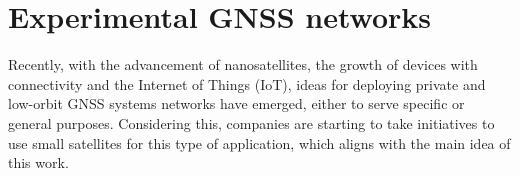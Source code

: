 
\section{Experimental GNSS networks}


Recently, with the advancement of nanosatellites, the growth of devices with connectivity and the Internet of Things (IoT), ideas for deploying private and low-orbit GNSS systems networks have emerged, either to serve specific or general purposes. Considering this, companies are starting to take initiatives to use small satellites for this type of application, which aligns with the main idea of this work.


